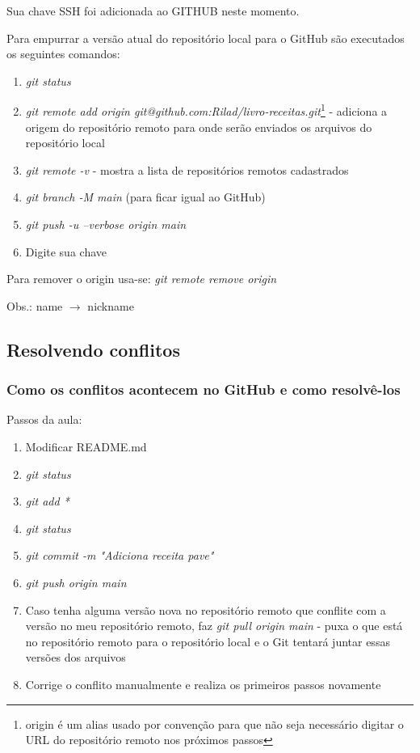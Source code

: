 \documentclass[12pt,a4paper]{article}
\begin{document}
	Sua chave SSH foi adicionada ao GITHUB neste momento.
	
	Para empurrar a versão atual do repositório local para o GitHub são executados os seguintes comandos:
	
	\begin{enumerate}
		\item \textit{git status}
		\item \textit{git remote add origin git@github.com:Rilad/livro-receitas.git}\footnote{origin é um alias usado por convenção para que não seja necessário digitar o URL do repositório remoto nos próximos passos} - adiciona a origem do repositório remoto para onde serão enviados os arquivos do repositório local
		\item \textit{git remote -v} - mostra a lista de repositórios remotos cadastrados
		\item \textit{git branch -M main} (para ficar igual ao GitHub)
		\item \textit{git push -u --verbose origin main}
		\item Digite sua chave
	\end{enumerate}
	
	Para remover o origin usa-se: \textit{git remote remove origin}
	
	Obs.: name $\rightarrow$ nickname
	
	\subsection{Resolvendo conflitos}
	
	\subsubsection{Como os conflitos acontecem no GitHub e como resolvê-los}
	
	Passos da aula:
	
	\begin{enumerate}
		\item Modificar README.md
		\item \textit{git status}
		\item \textit{git add *}
		\item \textit{git status}
		\item \textit{git commit -m "Adiciona receita pave"}
		\item \textit{git push origin main}
		\item Caso tenha alguma versão nova no repositório remoto que conflite com a versão no meu repositório remoto, faz \textit{git pull origin main} - puxa o que está no repositório remoto para o repositório local e o Git tentará juntar essas versões dos arquivos
		\item Corrige o conflito manualmente e realiza os primeiros passos novamente
	\end{enumerate}
\end{document}
